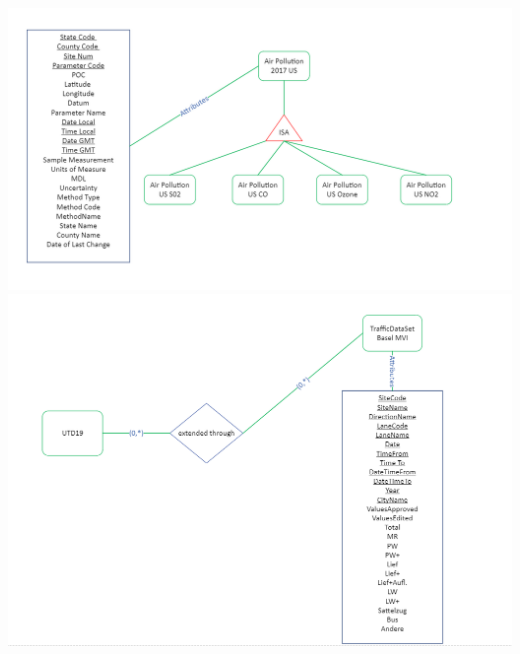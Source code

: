 \documentclass{article}
\begin{document}
\includegraphics[scale=0.6]{fourth.png}
\includegraphics[scale=0.6]{fifth.png}
\end{document}
